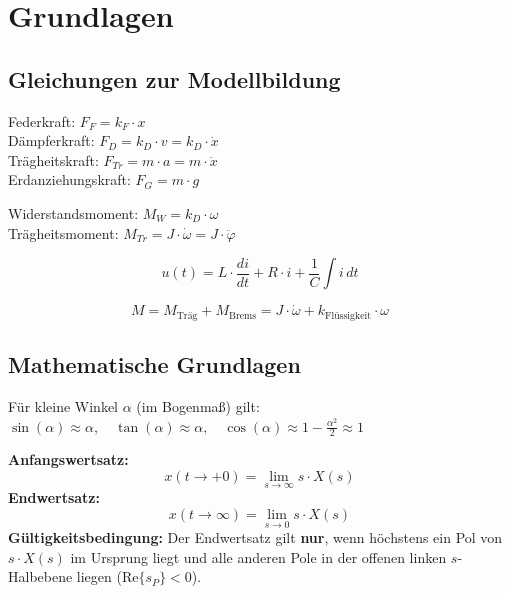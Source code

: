 \section{Grundlagen}

\subsection{Gleichungen zur Modellbildung}

\begin{tcolorbox}
Federkraft: $F_F = k_F \cdot x$\\[2pt]
Dämpferkraft: $F_D = k_D \cdot v = k_D \cdot \dot{x}$\\[2pt]
Trägheitskraft: $F_{Tr} = m \cdot a = m \cdot \ddot{x}$\\[2pt]
Erdanziehungskraft: $F_G = m \cdot g$
\end{tcolorbox}

\begin{tcolorbox}
Widerstandsmoment: $M_W = k_D \cdot \omega$\\[2pt]
Trägheitsmoment: $M_{Tr} = J \cdot \dot{\omega} = J \cdot \ddot{\varphi}$
\end{tcolorbox}

\begin{tcolorbox}
\[
u(t) = L \cdot \frac{di}{dt} + R \cdot i + \frac{1}{C} \int i \, dt
\]
\end{tcolorbox}

\begin{tcolorbox}
\[
M = M_{\text{Träg}} + M_{\text{Brems}} = J \cdot \dot{\omega} + k_{\text{Flüssigkeit}} \cdot \omega
\]
\end{tcolorbox}

\subsection{Mathematische Grundlagen}
\begin{tcolorbox}
Für kleine Winkel $\alpha$ (im Bogenmaß) gilt:\\[2pt]
$\sin(\alpha) \approx \alpha, \quad \tan(\alpha) \approx \alpha, \quad \cos(\alpha) \approx 1 - \frac{\alpha^2}{2} \approx 1$
\end{tcolorbox}

\begin{tcolorbox}
\textbf{Anfangswertsatz:}\\[2pt]
\[
x(t \to +0) = \lim_{s \to \infty} s \cdot X(s)
\]
\textbf{Endwertsatz:}\\[2pt]
\[
x(t \to \infty) = \lim_{s \to 0} s \cdot X(s)
\]
\textbf{Gültigkeitsbedingung:} Der Endwertsatz gilt \textbf{nur}, wenn höchstens ein Pol von $s \cdot X(s)$ im Ursprung liegt und alle anderen Pole in der offenen linken $s$-Halbebene liegen ($\text{Re}\{s_P\} < 0$).
\end{tcolorbox}

